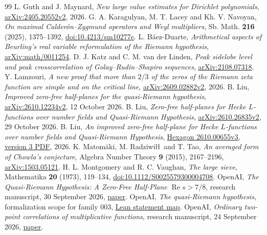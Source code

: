 \documentclass[11pt]{amsart}
\theoremstyle{definition}
\theoremstyle{remark}
\newcommand{\R}{\operatorname{Re}}
\numberwithin{equation}{section}
\begin{document}
\begin{thebibliography}{99}
 L. Guth and J. Maynard, \emph{New large value estimates for Dirichlet polynomials}, \href{https://arxiv.org/abs/2405.20552v2}{arXiv:2405.20552v2}, 2026.
 G. A. Karagulyan, M. T. Lacey and Kh. V. Navoyan, \emph{On maximal Calder\'on--Zygmund operators and Weyl multipliers}, Sb. Math. \textbf{216} (2025), 1375--1392, \href{https://doi.org/10.4213/sm10277e}{doi:10.4213/sm10277e}.
 L. B\'aez-Duarte, \emph{Arithmetical aspects of Beurling's real variable reformulation of the Riemann hypothesis}, \href{https://arxiv.org/abs/math/0011254}{arXiv:math/0011254}.
 D. J. Katz and C. M. van der Linden, \emph{Peak sidelobe level and peak crosscorrelation of Golay--Rudin--Shapiro sequences}, \href{https://arxiv.org/abs/2108.07318}{arXiv:2108.07318}.
 Y. Lamzouri, \emph{A new proof that more than \(2/3\) of the zeros of the Riemann zeta function are simple and on the critical line}, \href{https://arxiv.org/abs/2609.02882v2}{arXiv:2609.02882v2}, 2026.
 B. Liu, \emph{Improved zero-free half-planes for the quasi-Riemann hypothesis}, \href{https://arxiv.org/abs/2610.12234v2}{arXiv:2610.12234v2}, 12 October 2026.
 B. Liu, \emph{Zero-free half-planes for Hecke \(L\)-functions over number fields and Quasi-Riemann Hypothesis}, \href{https://arxiv.org/abs/2610.26835v2}{arXiv:2610.26835v2}, 29 October 2026.
 B. Liu, \emph{An improved zero-free half-plane for Hecke \(L\)-functions over number fields and Quasi-Riemann Hypothesis}, \href{https://hexagonmath.org/pdf/2610.00655v3}{Hexagon 2610.00655v3, version 3 PDF}, 2026.
 K. Matom\"aki, M. Radziwi\l\l\ and T. Tao, \emph{An averaged form of Chowla's conjecture}, Algebra Number Theory \textbf{9} (2015), 2167--2196, \href{https://arxiv.org/abs/1503.05121}{arXiv:1503.05121}.
 H. L. Montgomery and R. C. Vaughan, \emph{The large sieve}, Mathematika \textbf{20} (1973), 119--134, \href{https://doi.org/10.1112/S0025579300004708}{doi:10.1112/S0025579300004708}.
 OpenAI, \emph{The Quasi-Riemann Hypothesis: A Zero-Free Half-Plane \(\R s>7/8\)}, research manuscript, 30 September 2026, \href{https://github.com/openai/math/blob/main/preprints/The-Quasi-Riemann-Hypothesis-September-30-2026/paper.pdf}{paper}.
 OpenAI, \emph{The quasi-Riemann hypothesis}, formalization scope for family 003, \href{https://github.com/openai/math/blob/main/lean/docs/003.md}{Lean statement map}.
 OpenAI, \emph{Ordinary two-point correlations of multiplicative functions}, research manuscript, 24 September 2026, \href{https://github.com/openai/math/blob/main/preprints/Ordinary-two-point-correlations-of-multiplicative-functions-September-24-2026/final.pdf}{paper}.

\end{thebibliography}
\end{document}
